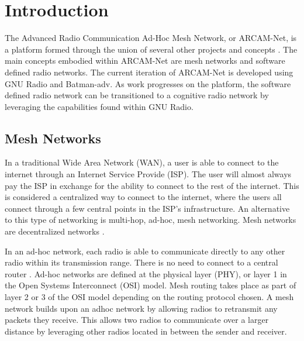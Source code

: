
\chapter{Introduction} %

\label{Chapter1} %

The Advanced Radio Communication Ad-Hoc Mesh Network, or ARCAM-Net, is a platform formed through the union of several other projects and concepts \cite{selfpaper}. The main concepts embodied within ARCAM-Net are mesh networks and software defined radio networks. The current iteration of ARCAM-Net is developed using GNU Radio and Batman-adv. As work progresses on the platform, the software defined radio network can be transitioned to a cognitive radio network by leveraging the capabilities found within GNU Radio. 


\newcommand{\keyword}[1]{\textbf{#1}}
\newcommand{\tabhead}[1]{\textbf{#1}}
\newcommand{\code}[1]{\texttt{#1}}
\newcommand{\file}[1]{\texttt{\bfseries#1}}
\newcommand{\option}[1]{\texttt{\itshape#1}}


\section{Mesh Networks}

In a traditional Wide Area Network (WAN), a user is able to connect to the internet through an Internet Service Provide (ISP). The user will almost always pay the ISP in exchange for the ability to connect to the rest of the internet. This is considered a centralized way to connect to the internet, where the users all connect through a few central points in the ISP's infrastructure. An alternative to this type of networking is multi-hop, ad-hoc, mesh networking. Mesh networks are decentralized networks \cite{4796928}. 

In an ad-hoc network, each radio is able to communicate directly to any other radio within its transmission range. There is no need to connect to a central router \cite{4796928}. Ad-hoc networks are defined at the physical layer (PHY), or layer 1 in the Open Systems Interconnect (OSI) model. Mesh routing takes place as part of layer 2 or 3 of the OSI model depending on the routing protocol chosen. A mesh network builds upon an adhoc network by allowing radios to retransmit any packets they receive. This allows two radios to communicate over a larger distance by leveraging other radios located in between the sender and receiver\cite{0033}. 

